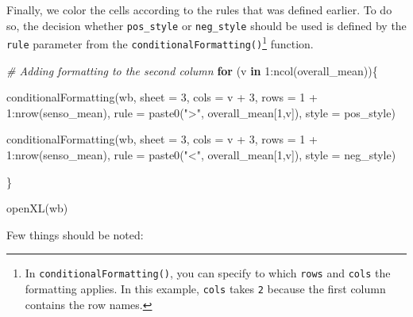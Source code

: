 \documentclass[
]{book}
\newenvironment{Shaded}{\begin{snugshade}}{\end{snugshade}}
\newcommand{\AttributeTok}[1]{\textcolor[rgb]{0.77,0.63,0.00}{#1}}
\newcommand{\CommentTok}[1]{\textcolor[rgb]{0.56,0.35,0.01}{\textit{#1}}}
\newcommand{\ControlFlowTok}[1]{\textcolor[rgb]{0.13,0.29,0.53}{\textbf{#1}}}
\newcommand{\DecValTok}[1]{\textcolor[rgb]{0.00,0.00,0.81}{#1}}
\newcommand{\FunctionTok}[1]{\textcolor[rgb]{0.00,0.00,0.00}{#1}}
\newcommand{\NormalTok}[1]{#1}
\newcommand{\SpecialCharTok}[1]{\textcolor[rgb]{0.00,0.00,0.00}{#1}}
\newcommand{\StringTok}[1]{\textcolor[rgb]{0.31,0.60,0.02}{#1}}
\begin{document}
Finally, we color the cells according to the rules that was defined earlier. To do so, the decision whether \texttt{pos\_style} or \texttt{neg\_style} should be used is defined by the \texttt{rule} parameter from the \texttt{conditionalFormatting()}\footnote{In \texttt{conditionalFormatting()}, you can specify to which \texttt{rows} and \texttt{cols} the formatting applies. In this example, \texttt{cols} takes \texttt{2} because the first column contains the row names.} function.

\begin{Shaded}
\begin{Highlighting}[]
\CommentTok{\# Adding formatting to the second column}
\ControlFlowTok{for}\NormalTok{ (v }\ControlFlowTok{in} \DecValTok{1}\SpecialCharTok{:}\FunctionTok{ncol}\NormalTok{(overall\_mean))\{}
  
  \FunctionTok{conditionalFormatting}\NormalTok{(wb,}
                        \AttributeTok{sheet =} \DecValTok{3}\NormalTok{,}
                        \AttributeTok{cols  =}\NormalTok{ v }\SpecialCharTok{+} \DecValTok{3}\NormalTok{,}
                        \AttributeTok{rows  =} \DecValTok{1} \SpecialCharTok{+} \DecValTok{1}\SpecialCharTok{:}\FunctionTok{nrow}\NormalTok{(senso\_mean), }
                        \AttributeTok{rule  =} \FunctionTok{paste0}\NormalTok{(}\StringTok{"\textgreater{}"}\NormalTok{, overall\_mean[}\DecValTok{1}\NormalTok{,v]),}
                        \AttributeTok{style =}\NormalTok{ pos\_style)}
  
  \FunctionTok{conditionalFormatting}\NormalTok{(wb,}
                        \AttributeTok{sheet =} \DecValTok{3}\NormalTok{,}
                        \AttributeTok{cols  =}\NormalTok{ v }\SpecialCharTok{+} \DecValTok{3}\NormalTok{,}
                        \AttributeTok{rows  =} \DecValTok{1} \SpecialCharTok{+} \DecValTok{1}\SpecialCharTok{:}\FunctionTok{nrow}\NormalTok{(senso\_mean), }
                        \AttributeTok{rule  =} \FunctionTok{paste0}\NormalTok{(}\StringTok{"\textless{}"}\NormalTok{, overall\_mean[}\DecValTok{1}\NormalTok{,v]),}
                        \AttributeTok{style =}\NormalTok{ neg\_style)}
  
\NormalTok{\}}

\FunctionTok{openXL}\NormalTok{(wb)}
\end{Highlighting}
\end{Shaded}

Few things should be noted:
\end{document}
